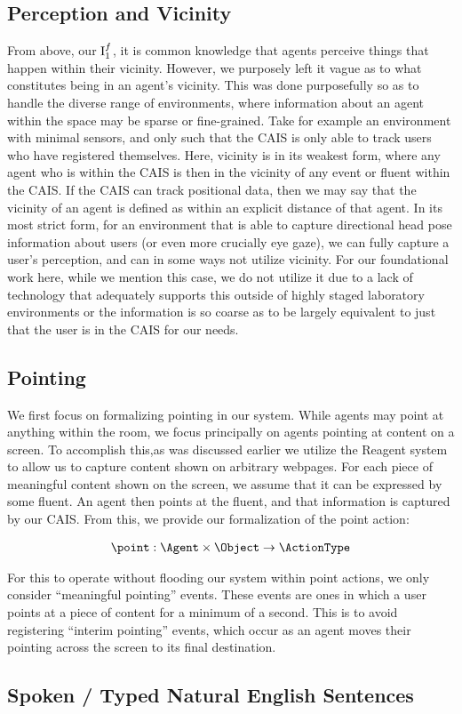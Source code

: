 \subsection{Perception and Vicinity}

From above, our $\textnormal{I}_{1}^{f}$, it is common knowledge that agents perceive
things that happen within their vicinity. However, we purposely left it vague as to
what constitutes being in an agent's vicinity. This was done purposefully so as to
handle the diverse range of environments, where information about an agent within
the space may be sparse or fine-grained. Take for example an environment with minimal
sensors, and only such that the CAIS is only able to track users who have registered
themselves. Here, vicinity is in its weakest form, where any agent who is within the CAIS
is then in the vicinity of any event or fluent within the CAIS. If the CAIS can track
positional data, then we may say that the vicinity of an agent is defined as within an
explicit distance of that agent. In its most strict form, for an environment that is
able to capture directional head pose information about users (or even more crucially
eye gaze), we can fully capture a user's perception, and can in some ways not utilize
vicinity. For our foundational work here, while we mention this case, we do not utilize it
due to a lack of technology that adequately supports this outside of highly staged
laboratory environments or the information is so coarse as to be largely equivalent to just
that the user is in the CAIS for our needs.

\subsection{Pointing}

We first focus on formalizing pointing in our system. While agents may point at anything 
within the room, we focus principally on agents pointing at content on a screen. To 
accomplish this,as was discussed earlier we utilize the Reagent system to allow us to
capture content  shown on arbitrary webpages. For each piece of meaningful content shown on 
the screen, we  assume that it can be expressed by some fluent. An agent then points at the 
fluent, and that information is captured by our CAIS. From this, we provide our
formalization of the point action:

\begin{equation*}
\begin{aligned}
  \point: \Agent \times \Object \rightarrow \ActionType
\end{aligned}
\end{equation*}

For this to operate without flooding our system within point actions, we only consider
``meaningful pointing'' events. These events are ones in which a user points at a piece
of content for a minimum of a second. This is to avoid registering ``interim pointing''
events, which occur as an agent moves their pointing across the screen to its final
destination.

\subsection{Spoken / Typed Natural English Sentences}
